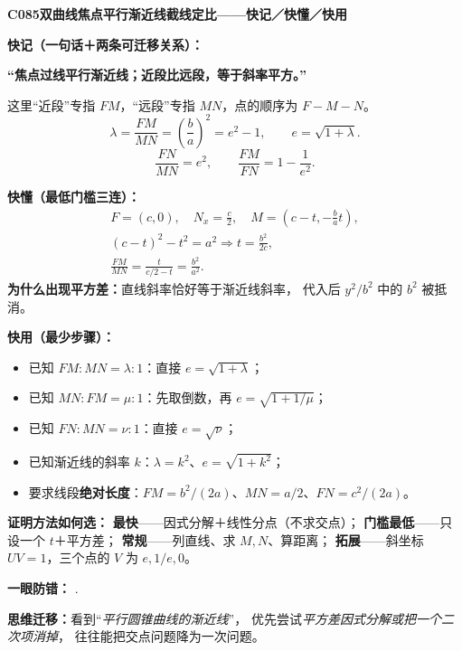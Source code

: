 \clearpage
\begin{summarybox}
\textbf{C085\quad 双曲线焦点平行渐近线截线定比——快记／快懂／快用}

\textbf{快记（一句话＋两条可迁移关系）：}
\begin{center}
\textbf{“焦点过线平行渐近线；近段比远段，等于斜率平方。”}
\end{center}
这里“近段”专指 $FM$，“远段”专指 $MN$，点的顺序为 $F-M-N$。
\[
\boxed{\lambda=\frac{FM}{MN}
=\left(\frac ba\right)^2=e^2-1},
\qquad\boxed{e=\sqrt{1+\lambda}}.
\]
\[
\boxed{\frac{FN}{MN}=e^2},\qquad
\boxed{\frac{FM}{FN}=1-\frac1{e^2}}.
\]

\textbf{快懂（最低门槛三连）：}
\[
\begin{gathered}
F=(c,0),\quad N_x=\frac c2,\quad
M=\left(c-t,-\frac ba t\right),\\[2pt]
(c-t)^2-t^2=a^2
\Longrightarrow t=\frac{b^2}{2c},\\[2pt]
\frac{FM}{MN}=\frac{t}{c/2-t}=\frac{b^2}{a^2}.
\end{gathered}
\]
\textbf{为什么出现平方差：}直线斜率恰好等于渐近线斜率，
代入后 $y^2/b^2$ 中的 $b^2$ 被抵消。

\textbf{快用（最少步骤）：}
\begin{itemize}
\item 已知 $FM:MN=\lambda:1$：直接 $e=\sqrt{1+\lambda}$；
\item 已知 $MN:FM=\mu:1$：先取倒数，再 $e=\sqrt{1+1/\mu}$；
\item 已知 $FN:MN=\nu:1$：直接 $e=\sqrt{\nu}$；
\item 已知渐近线的斜率 $k$：$\lambda=k^2$、$e=\sqrt{1+k^2}$；
\item 要求线段\textbf{绝对长度}：$FM=b^2/(2a)$、$MN=a/2$、$FN=c^2/(2a)$。
\end{itemize}

\textbf{证明方法如何选：}
\textbf{最快}——因式分解＋线性分点（不求交点）；
\textbf{门槛最低}——只设一个 $t$＋平方差；
\textbf{常规}——列直线、求 $M,N$、算距离；
\textbf{拓展}——斜坐标 $UV=1$，三个点的 $V$ 为 $e,1/e,0$。

\textbf{一眼防错：}
\quad{}\quad
{}\quad{}\quad
{}.

\textbf{思维迁移：}看到“\emph{平行圆锥曲线的渐近线}”，
优先尝试\emph{平方差因式分解或把一个二次项消掉}，
往往能把交点问题降为一次问题。
\end{summarybox}
